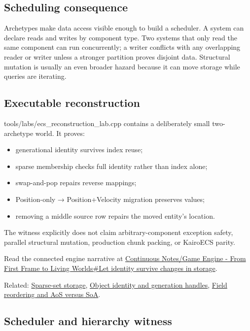 \subsection{Scheduling consequence}\label{appendix-fbfeb0430008-scheduling-consequence}

Archetypes make data access visible enough to build a scheduler. A system can declare reads and writes by component type. Two systems that only read the same component can run concurrently; a writer conflicts with any overlapping reader or writer unless a stronger partition proves disjoint data. Structural mutation is usually an even broader hazard because it can move storage while queries are iterating.

\subsection{Executable reconstruction}\label{appendix-fbfeb0430008-executable-reconstruction}

tools/labs/ecs\_reconstruction\_lab.cpp contains a deliberately small two-archetype world. It proves:

\begin{itemize}
\tightlist
\item
  generational identity survives index reuse;
\item
  sparse membership checks full identity rather than index alone;
\item
  swap-and-pop repairs reverse mappings;
\item
  Position-only → Position+Velocity migration preserves values;
\item
  removing a middle source row repairs the moved entity's location.
\end{itemize}

The witness explicitly does not claim arbitrary-component exception safety, parallel structural mutation, production chunk packing, or KairoECS parity.

Read the connected engine narrative at \hyperref[05-engine-i-ch014-let-identity-survive-changes-in-storage]{Continuous Notes/Game Engine - From First Frame to Living Worlds\#Let identity survive changes in storage}.

Related: \hyperref[appendix-8404d0b1a3e7]{Sparse-set storage}, \hyperref[appendix-f1581457d322]{Object identity and generation handles}, \hyperref[appendix-5522ad176ca0]{Field reordering and AoS versus SoA}.

\subsection{Scheduler and hierarchy witness}\label{appendix-fbfeb0430008-scheduler-and-hierarchy-witness}

